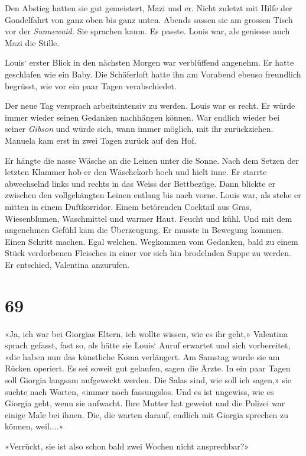 Den Abstieg hatten sie gut gemeistert, Mazi und er. Nicht zuletzt mit
Hilfe der Gondelfahrt von ganz oben bis ganz unten. Abends sassen sie am
grossen Tisch vor der \emph{Sunnewaid.} Sie sprachen kaum. Es passte.
Louis war, als geniesse auch Mazi die Stille.

Louis` erster Blick in den nächsten Morgen war verblüffend angenehm. Er
hatte geschlafen wie ein Baby. Die Schäferloft hatte ihn am Vorabend
ebenso freundlich begrüsst, wie vor ein paar Tagen verabschiedet.

Der neue Tag versprach arbeitsintensiv zu werden. Louis war es recht. Er
würde immer wieder seinen Gedanken nachhängen können. War endlich wieder
bei seiner \emph{Gibson} und würde sich, wann immer möglich, mit ihr
zurückziehen. Manuela kam erst in zwei Tagen zurück auf den Hof.

Er hängte die nasse Wäsche an die Leinen unter die Sonne. Nach dem
Setzen der letzten Klammer hob er den Wäschekorb hoch und hielt inne. Er
starrte abwechselnd links und rechts in das Weiss der Bettbezüge. Dann
blickte er zwischen den vollgehängten Leinen entlang bis nach vorne.
Louis war, als stehe er mitten in einem Duftkorridor. Einem betörenden
Cocktail aus Gras, Wiesenblumen, Waschmittel und warmer Haut. Feucht und
kühl. Und mit dem angenehmen Gefühl kam die Überzeugung. Er musste in
Bewegung kommen. Einen Schritt machen. Egal welchen. Wegkommen vom
Gedanken, bald zu einem Stück verdorbenen Fleisches in einer vor sich
hin brodelnden Suppe zu werden. Er entschied, Valentina anzurufen.

\chapter{69}\label{section-69}

«Ja, ich war bei Giorgias Eltern, ich wollte wissen, wie es ihr geht,»
Valentina sprach gefasst, fast so, als hätte sie Louis` Anruf erwartet
und sich vorbereitet, «die haben nun das künstliche Koma verlängert. Am
Samstag wurde sie am Rücken operiert. Es sei soweit gut gelaufen, sagen
die Ärzte. In ein paar Tagen soll Giorgia langsam aufgeweckt werden. Die
Salas sind, wie soll ich sagen,» sie suchte nach Worten, «immer noch
fassungslos. Und es ist ungewiss, wie es Giorgia geht, wenn sie
aufwacht. Ihre Mutter hat geweint und die Polizei war einige Male bei
ihnen. Die, die warten darauf, endlich mit Giorgia sprechen zu können,
weil....»

«Verrückt, sie ist also schon bald zwei Wochen nicht ansprechbar?»

